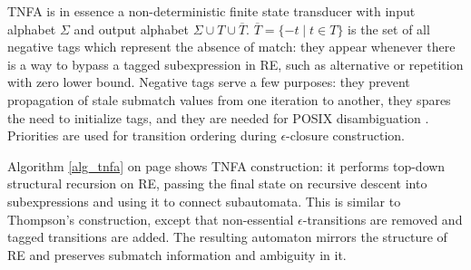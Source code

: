 \documentclass[]{article}
\newcommand*{\Xbar}[1]{\overline{#1}}
\begin{document}
TNFA is in essence a non-deterministic finite state transducer with input alphabet $\Sigma$ and output alphabet $\Sigma \cup T \cup \Xbar{T}$.
$\Xbar{T} = \{-t \mid t \in T\}$ is the set of all negative tags which represent the absence of match: they appear whenever there is a way to bypass a tagged subexpression in RE,
such as alternative or repetition with zero lower bound.
Negative tags serve a few purposes:
they prevent propagation of stale submatch values from one iteration to another,
they spares the need to initialize tags,
and they are needed for POSIX disambiguation \cite{BorTro19}.
Priorities are used for transition ordering during $\epsilon$-closure construction.
\medskip

Algorithm \ref{alg_tnfa} on page \pageref{alg_tnfa} shows TNFA construction:
it performs top-down structural recursion on RE, passing the final state on recursive descent into subexpressions
and using it to connect subautomata.
This is similar to Thompson's construction, except that non-essential $\epsilon$-transitions are removed and tagged transitions are added.
The resulting automaton mirrors the structure of RE and preserves submatch information and ambiguity in it.
\end{document}
